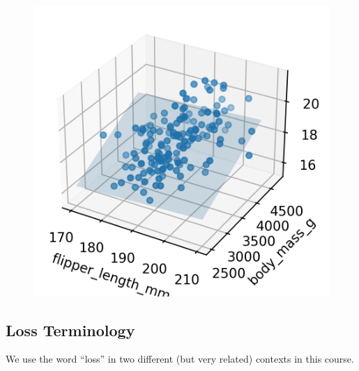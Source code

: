\documentclass[
  letterpaper,
  DIV=11,
  numbers=noendperiod]{scrreprt}
\begin{document}
\begin{figure}[H]

{\centering \includegraphics{gradient_descent/gradient_descent_files/figure-pdf/cell-20-output-1.png}

}

\end{figure}

\hypertarget{loss-terminology}{%
\subsection{Loss Terminology}\label{loss-terminology}}

We use the word ``loss'' in two different (but very related) contexts in
this course.
\end{document}
